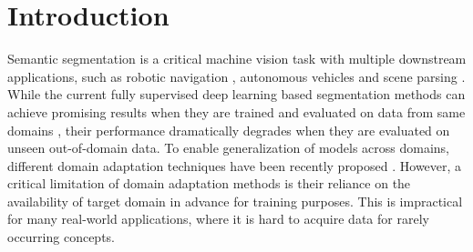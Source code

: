 \documentclass[10pt,twocolumn,letterpaper]{article}
\begin{document}
\section{Introduction}
\label{sec:intro}

Semantic segmentation is a critical machine vision task with multiple downstream applications, such as robotic navigation \cite{kim2018indoor,miyamoto2019vision,ye20183d,liu2020semantic}, autonomous vehicles \cite{geiger2012we,kumar2021syndistnet,yang2018denseaspp,peng2021sparse} and scene parsing \cite{zhang2020rapnet,zhang2020deep,zhang2017scale,lei2020hierarchical}. While the current fully supervised deep learning based segmentation methods can achieve promising results when they are trained and evaluated on data from same domains \cite{long2015fully,chen2014semantic,chen2017rethinking,chen2017deeplab,he2017mask,badrinarayanan2017segnet,zhang2019deep,ma2020global,zhang2020semantic}, their performance dramatically degrades when they are evaluated on unseen out-of-domain data. 
To enable generalization of models across domains, different domain adaptation techniques have been recently proposed \cite{ben2007analysis,ganin2015unsupervised,ganin2016domain,hoffman2018cycada,murez2018image,pan2020unsupervised,saito2018maximum,vu2019advent,zou2018unsupervised}. However, a critical limitation of domain adaptation methods is their reliance on the availability of target domain in advance for training purposes. This is impractical for many real-world applications, where it is hard to acquire data for rarely occurring concepts.
\end{document}
